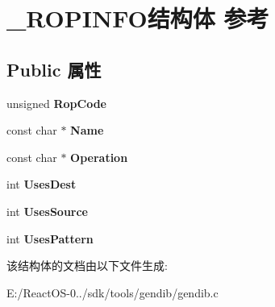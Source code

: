 \hypertarget{struct___r_o_p_i_n_f_o}{}\section{\+\_\+\+R\+O\+P\+I\+N\+F\+O结构体 参考}
\label{struct___r_o_p_i_n_f_o}
\subsection*{Public 属性}
\begin{DoxyCompactItemize}
\item 
\mbox{\label{struct___r_o_p_i_n_f_o_aeaf81706313e926f6e2c02a1111bfb98}} 
unsigned {\bfseries Rop\+Code}
\item 
\mbox{\label{struct___r_o_p_i_n_f_o_a0685a892b24b225702f28fe54c0d5def}} 
const char $\ast$ {\bfseries Name}
\item 
\mbox{\label{struct___r_o_p_i_n_f_o_a9045006c481377d446391c99f78ba93b}} 
const char $\ast$ {\bfseries Operation}
\item 
\mbox{\label{struct___r_o_p_i_n_f_o_ab96322c079fb98cc2048a20030f83713}} 
int {\bfseries Uses\+Dest}
\item 
\mbox{\label{struct___r_o_p_i_n_f_o_a796de3ac2d6b7d0976f6d63d05a78c95}} 
int {\bfseries Uses\+Source}
\item 
\mbox{\label{struct___r_o_p_i_n_f_o_a5664fe51271861893f6bed5d190628c2}} 
int {\bfseries Uses\+Pattern}
\end{DoxyCompactItemize}


该结构体的文档由以下文件生成\+:\begin{DoxyCompactItemize}
\item 
E\+:/\+React\+O\+S-\/0../sdk/tools/gendib/gendib.\+c\end{DoxyCompactItemize}

